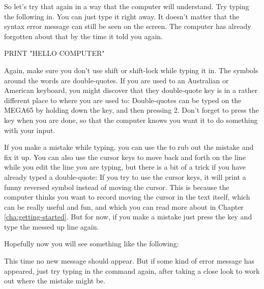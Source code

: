 \needspace{4cm} %

So let's try that again in a way that the computer will understand.  Try typing
  the following in.  You can just type it right away. It doesn't matter that the
  syntax error message can still be seen on the screen.  The computer has already
  forgotten about that by the time it told you  again.

\begin{screenoutput}
PRINT "HELLO COMPUTER"
\end{screenoutput}

Again, make sure you don't use shift or shift-lock while typing it in.  The symbols around
the words  are double-quotes.  If you are used to an Australian or American
keyboard, you might discover that they double-quote key is in a rather different place to
where you are used to:  Double-quotes can be typed on the MEGA65 by holding down the
 key, and then pressing 2.  Don't forget to press the 
key when you are done, so that the computer knows you want it to do something with your input.

If you make a mistake while typing, you can use the  to rub out the mistake
and fix it up.  You can also use the cursor keys to move back and forth on the line while
you edit the line you are typing, but there is a bit of a trick if you have already typed
a double-quote: If you try to use the cursor keys, it will print a funny reversed symbol
instead of moving the cursor.  This is because the computer thinks you want to record
moving the cursor in the text itself, which can be really useful and fun, and which you can
read more about in Chapter \ref{cha:getting-started}. But for now, if you
make a mistake just press the  key and type the messed up line again.

\needspace{4cm} %
Hopefully now you will see something like the following:


  This time no new  message should appear. But if some kind
  of error message has appeared, just try typing in the command again, after
  taking a close look to work out where the mistake might be.

